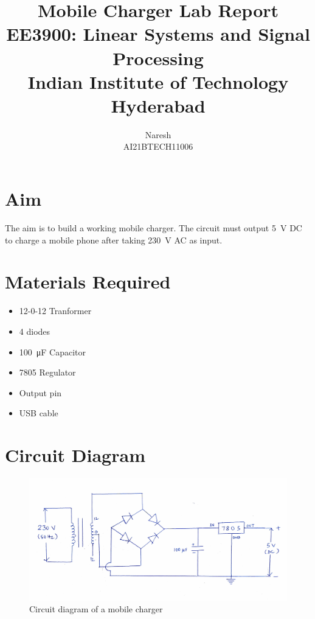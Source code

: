 \documentclass[journal,12pt,twocolumn]{IEEEtran}
\title{Mobile Charger Lab Report \\ \Large EE3900: Linear Systems and Signal Processing \\ \large Indian Institute of Technology Hyderabad}
\author{Naresh \\ \normalsize AI21BTECH11006 \\ \vspace*{20pt} }
\numberwithin{equation}{section}
\numberwithin{figure}{section}
\begin{document}
	\maketitle

	\section{Aim}
	The aim is to build a working mobile charger. The circuit must output \SI{5}{\volt} DC to charge a mobile phone after taking \SI{230}{\volt} AC as input.
	
	\section{Materials Required}
	\begin{itemize}
	\item 12-0-12 Tranformer
	\item 4 diodes
	\item \SI{100}{\micro\farad} Capacitor
	\item 7805 Regulator
	\item Output pin
	\item USB cable
	\end{itemize}

	\section{Circuit Diagram}
	\begin{figure}[!ht]
		\centering
		\includegraphics[width=\columnwidth]{./figs/circuit.pdf}
		\caption{Circuit diagram of a mobile charger}
		\label{fig-ckt}	
	\end{figure}
	
\end{document}
